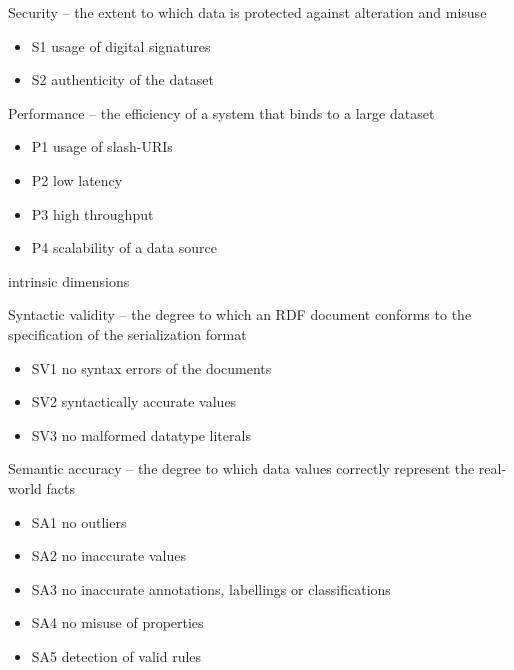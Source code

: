 Security -- the extent to which data is protected against alteration and misuse
\begin{itemize}
 \setlength{\parskip}{0pt}
 \setlength{\itemsep}{0pt plus 1pt}
 \item S1 usage of digital signatures
 \item S2 authenticity of the dataset
\end{itemize}

Performance -- the efficiency of a system that binds to a large dataset
\begin{itemize}
 \setlength{\parskip}{0pt}
 \setlength{\itemsep}{0pt plus 1pt}
 \item P1 usage of slash-URIs
 \item P2 low latency
 \item P3 high throughput
 \item P4 scalability of a data source
\end{itemize}

intrinsic dimensions

Syntactic validity -- the degree to which an RDF document conforms to the specification of the serialization format
\begin{itemize}
 \setlength{\parskip}{0pt}
 \setlength{\itemsep}{0pt plus 1pt}
 \item SV1 no syntax errors of the documents
 \item SV2 syntactically accurate values
 \item SV3 no malformed datatype literals
\end{itemize}

Semantic accuracy -- the degree to which data values correctly represent the real-world facts
\begin{itemize}
 \setlength{\parskip}{0pt}
 \setlength{\itemsep}{0pt plus 1pt}
 \item SA1 no outliers
 \item SA2 no inaccurate values
 \item SA3 no inaccurate annotations, labellings or classifications
 \item SA4 no misuse of properties
 \item SA5 detection of valid rules
\end{itemize}

